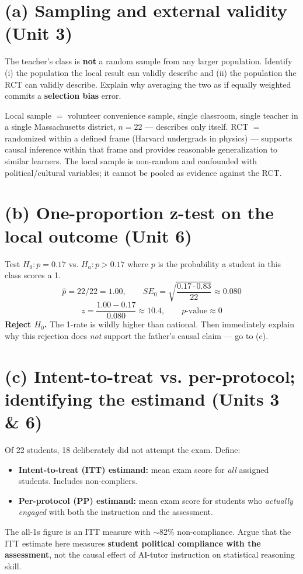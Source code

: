 \documentclass[11pt]{article}
\begin{document}
\section{(a) Sampling and external validity \textnormal{\small(Unit 3)}}

The teacher's class is \textbf{not} a random sample from any larger
population. Identify (i) the population the local result can validly
describe and (ii) the population the RCT can validly describe.
Explain why averaging the two as if equally weighted commits a
\textbf{selection bias} error.

\begin{expectedbox}
Local sample $=$ volunteer convenience sample, single classroom,
single teacher in a single Massachusetts district, $n = 22$ ---
describes only itself. RCT $=$ randomized within a defined frame
(Harvard undergrads in physics) --- supports causal inference within
that frame and provides reasonable generalization to similar
learners. The local sample is non-random and confounded with
political/cultural variables; it cannot be pooled as evidence
against the RCT.
\end{expectedbox}

\section{(b) One-proportion z-test on the local outcome \textnormal{\small(Unit 6)}}

Test $H_0: p = 0.17$ vs. $H_a: p > 0.17$ where $p$ is the probability
a student in this class scores a 1.
\[
\hat{p} = 22/22 = 1.00, \qquad
SE_0 = \sqrt{\frac{0.17 \cdot 0.83}{22}} \approx 0.080
\]
\[
z = \frac{1.00 - 0.17}{0.080} \approx 10.4,
\qquad p\text{-value} \approx 0
\]
\textbf{Reject $H_0$.} The 1-rate is wildly higher than national.
Then immediately explain why this rejection does \emph{not} support
the father's causal claim --- go to (c).

\section{(c) Intent-to-treat vs. per-protocol; identifying the estimand \textnormal{\small(Units 3 \& 6)}}

Of 22 students, 18 deliberately did not attempt the exam. Define:
\begin{itemize}[leftmargin=*]
  \item \textbf{Intent-to-treat (ITT) estimand:} mean exam score for
  \emph{all} assigned students. Includes non-compliers.
  \item \textbf{Per-protocol (PP) estimand:} mean exam score for
  students who \emph{actually engaged} with both the instruction and
  the assessment.
\end{itemize}
The all-1s figure is an ITT measure with $\sim$82\% non-compliance.
Argue that the ITT estimate here measures \textbf{student political
compliance with the assessment}, not the causal effect of AI-tutor
instruction on statistical reasoning skill.
\end{document}
